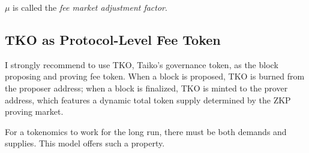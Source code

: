 \documentclass[9pt,oneside]{amsart}
\begin{document}
\begin{multicols}{2}
$\mu$ is called the \textit{fee market adjustment factor}.

\subsection{TKO as Protocol-Level Fee Token}
I strongly recommend to use TKO, Taiko's governance token,  as the block proposing and proving fee token. When a block is proposed, TKO is burned from the proposer address; when a block is finalized, TKO is minted to the prover address, which features a dynamic total token supply determined by the ZKP proving market.

For a tokenomics to work for the long run, there must be both demands and supplies. This model offers such a property.
\end{multicols}
\end{document}
